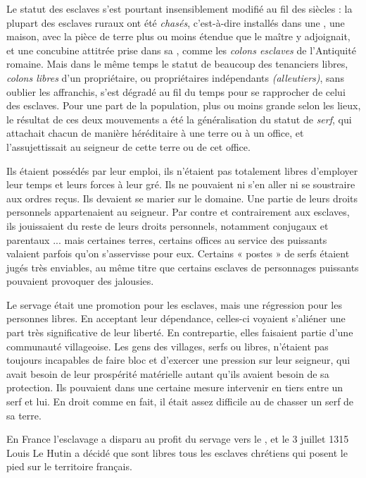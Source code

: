  Le statut des esclaves s'est pourtant insensiblement modifié au fil des siècles : la plupart des esclaves ruraux ont été \emph{chasés}, c'est-à-dire installés dans une , une maison, avec la pièce de terre plus ou moins étendue que le maître y adjoignait, et une concubine attitrée prise dans sa , comme les \emph{colons esclaves} de l'Antiquité romaine. Mais dans le même temps le statut de beaucoup des tenanciers libres, \emph{colons libres} d'un propriétaire, ou propriétaires indépendants \emph{(alleutiers)}, sans oublier les affranchis, s'est dégradé au fil du temps pour se rapprocher de celui des esclaves. Pour une part de la population, plus ou moins grande selon les lieux, le résultat de ces deux mouvements a été la généralisation du statut de \emph{serf}, qui attachait chacun de manière héréditaire à une terre ou à un office, et l'assujettissait au seigneur  de cette terre ou de cet office. 

 Ils étaient possédés par leur emploi, ils n'étaient pas totalement libres d'employer leur temps et leurs forces à leur gré. Ils ne pouvaient ni s'en aller ni se soustraire aux ordres reçus. Ils devaient se marier sur le domaine. Une partie de leurs droits personnels appartenaient au seigneur. Par contre et contrairement aux esclaves, ils jouissaient du reste de leurs droits personnels, notamment conjugaux et parentaux ... mais certaines terres, certains offices au service des puissants valaient parfois qu'on s'asservisse pour eux. Certains « postes » de serfs étaient jugés très enviables, au même titre que certains esclaves de personnages puissants pouvaient provoquer des jalousies.

 Le servage était une promotion pour les esclaves, mais une régression pour les personnes libres. En acceptant leur dépendance, celles-ci voyaient s'aliéner une part très significative de leur liberté. En contrepartie, elles faisaient partie d'une communauté villageoise. Les gens des villages, serfs ou libres, n'étaient pas toujours incapables de faire bloc et d'exercer une pression sur leur seigneur, qui avait besoin de leur prospérité matérielle autant qu'ils avaient besoin de sa protection. Ils pouvaient dans une certaine mesure intervenir en tiers entre un serf et lui. En droit comme en fait, il était assez difficile au  de chasser un serf de sa terre. 
 
 En France l'esclavage a disparu au profit du servage vers le , et le 3 juillet 1315 Louis Le Hutin a décidé que sont libres tous les esclaves chrétiens qui posent le pied sur le territoire français. 

